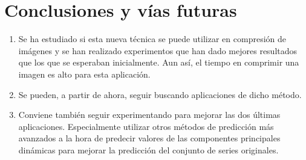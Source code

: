 \documentclass[leqno]{beamer}
\begin{document}

\section{Conclusiones y vías futuras}

\begin{frame}
\begin{enumerate}
\item Se ha estudiado si esta nueva técnica se puede utilizar en compresión de imágenes y se han realizado experimentos que han dado mejores resultados que los que se esperaban inicialmente. Aun así, el tiempo en comprimir una imagen es alto para esta aplicación.
\item Se pueden, a partir de ahora, seguir buscando aplicaciones de dicho método.
\item Conviene también seguir experimentando para mejorar las dos últimas aplicaciones. Especialmente utilizar otros métodos de predicción más avanzados a la hora de predecir valores de las componentes principales dinámicas para mejorar la predicción del conjunto de series originales.
\end{enumerate}
\end{frame}
\end{document}
